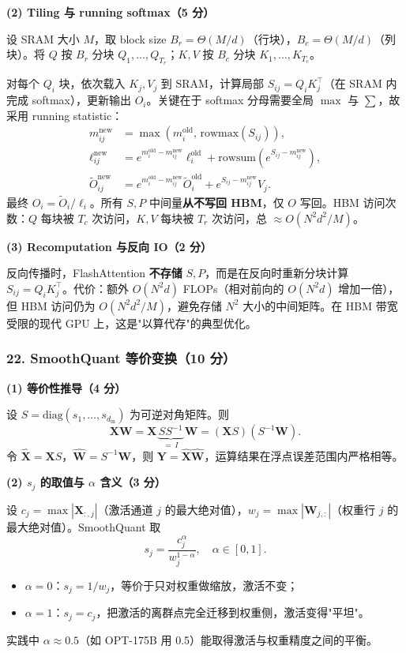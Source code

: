 \documentclass[11pt,a4paper]{article}
\begin{document}
\noindent\textbf{(2) Tiling 与 running softmax（5 分）}

设 SRAM 大小 $M$，取 block size $B_r = \Theta(M/d)$（行块），$B_c=\Theta(M/d)$（列块）。将 $Q$ 按 $B_r$ 分块 $Q_1,\dots,Q_{T_r}$；$K,V$ 按 $B_c$ 分块 $K_1,\dots,K_{T_c}$。

对每个 $Q_i$ 块，依次载入 $K_j, V_j$ 到 SRAM，计算局部 $S_{ij}=Q_i K_j^{\top}$（在 SRAM 内完成 softmax），更新输出 $O_i$。关键在于 softmax 分母需要全局 $\max$ 与 $\sum$，故采用 running statistic：
\begin{align*}
m_{ij}^{\text{new}} &= \max(m_i^{\text{old}},\, \mathrm{rowmax}(S_{ij})),\\
\ell_{ij}^{\text{new}} &= e^{m_i^{\text{old}}-m_{ij}^{\text{new}}}\ell_i^{\text{old}} + \mathrm{rowsum}\!\left(e^{S_{ij}-m_{ij}^{\text{new}}}\right),\\
\tilde{O}_{ij}^{\text{new}} &= e^{m_i^{\text{old}}-m_{ij}^{\text{new}}}\tilde{O}_i^{\text{old}} + e^{S_{ij}-m_{ij}^{\text{new}}} V_j.
\end{align*}
最终 $O_i = \tilde{O}_i / \ell_i$。所有 $S,P$ 中间量\textbf{从不写回 HBM}，仅 $O$ 写回。HBM 访问次数：$Q$ 每块被 $T_c$ 次访问，$K,V$ 每块被 $T_r$ 次访问，总 $\approx O(N^2 d^2/M)$。

\noindent\textbf{(3) Recomputation 与反向 IO（2 分）}

反向传播时，FlashAttention \textbf{不存储} $S,P$，而是在反向时重新分块计算 $S_{ij}=Q_i K_j^{\top}$。代价：额外 $O(N^2 d)$ FLOPs（相对前向的 $O(N^2 d)$ 增加一倍），但 HBM 访问仍为 $O(N^2 d^2/M)$，避免存储 $N^2$ 大小的中间矩阵。在 HBM 带宽受限的现代 GPU 上，这是"以算代存"的典型优化。

\subsubsection*{22. SmoothQuant 等价变换（10 分）}

\noindent\textbf{(1) 等价性推导（4 分）}

设 $S=\mathrm{diag}(s_1,\dots,s_{d_{\text{in}}})$ 为可逆对角矩阵。则
\[
\mathbf{X}\mathbf{W} = \mathbf{X}\,\underbrace{S S^{-1}}_{=\,I}\,\mathbf{W} = (\mathbf{X}S)(S^{-1}\mathbf{W}).
\]
令 $\widehat{\mathbf{X}}=\mathbf{X}S$，$\widehat{\mathbf{W}}=S^{-1}\mathbf{W}$，则 $\mathbf{Y}=\widehat{\mathbf{X}}\widehat{\mathbf{W}}$，运算结果在浮点误差范围内严格相等。

\noindent\textbf{(2) $s_j$ 的取值与 $\alpha$ 含义（3 分）}

设 $c_j=\max|\mathbf{X}_{:,j}|$（激活通道 $j$ 的最大绝对值），$w_j=\max|\mathbf{W}_{j,:}|$（权重行 $j$ 的最大绝对值）。SmoothQuant 取
\[
s_j = \frac{c_j^{\alpha}}{w_j^{1-\alpha}},\quad \alpha\in[0,1].
\]
\begin{itemize}[leftmargin=2em,itemsep=0pt,parsep=0pt,topsep=0pt]
  \item $\alpha=0$：$s_j=1/w_j$，等价于只对权重做缩放，激活不变；
  \item $\alpha=1$：$s_j=c_j$，把激活的离群点完全迁移到权重侧，激活变得"平坦"。
\end{itemize}
实践中 $\alpha\approx 0.5$（如 OPT-175B 用 0.5）能取得激活与权重精度之间的平衡。
\end{document}

